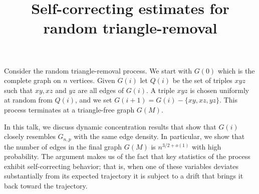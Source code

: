 \documentclass{article}
\begin{document}
%
%
%
%
%
%
%
{}
\title{Self-correcting estimates for random triangle-removal}
\endtitle
Consider the random triangle-removal process.  We
start with $G(0)$ which is the complete graph on
$n$ vertices.  Given $G(i)$ let $Q(i)$ be the set of
triples $xyz$ such that $xy,xz$ and $yz$ are all
edges of $G(i)$.  A triple $xyz$ is chosen uniformly
at random from $Q(i)$, and we set
$G(i+1) = G(i) - \{ xy,xz,yz \}$.  This process
terminates at a triangle-free graph $G(M)$.

In this talk, we discuss dynamic concentration
results that show that $G(i)$ closely resembles
$ G_{n,p} $ with the same edge density.  In
particular, we show that the number of edges in
the final graph $ G(M)$ is $ n^{3/2 + o(1)}$ with
high probability.  The argument makes us of the
fact that key statistics of the process exhibit
self-correcting behavior; that is, when one of
these variables deviates substantially from its
expected trajectory it is subject to a drift that
brings it back toward the trajectory.
\end{document}
